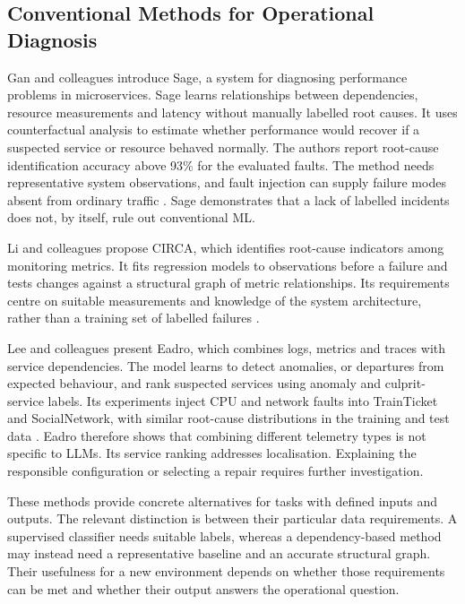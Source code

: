 \subsection{Conventional Methods for Operational Diagnosis}

Gan and colleagues introduce Sage, a system for diagnosing performance problems in
microservices. Sage learns relationships between dependencies, resource
measurements and latency without manually labelled root causes. It uses
counterfactual analysis to estimate whether performance would recover if
a suspected service or resource behaved normally. The authors report
root-cause identification accuracy above 93\% for the evaluated faults.
The method needs representative system observations, and fault injection
can supply failure modes absent from ordinary traffic
\parencite[Sections~3--4, 6--7]{gan2021sage}. Sage demonstrates that a lack
of labelled incidents does not, by itself, rule out conventional ML.

Li and colleagues propose CIRCA, which identifies root-cause indicators among
monitoring metrics. It fits regression models to observations before a
failure and tests changes against a structural graph of metric
relationships. Its requirements centre on suitable measurements and
knowledge of the system architecture, rather than a training set of
labelled failures \parencite[Section~4]{li2022circa}.

Lee and colleagues present Eadro, which combines logs, metrics and traces with
service dependencies. The model learns to detect anomalies, or departures
from expected behaviour, and rank
suspected services using anomaly and culprit-service labels. Its
experiments inject CPU and network faults into TrainTicket and
SocialNetwork, with similar root-cause distributions in the training and
test data \parencite[Sections~IV--V]{lee2023eadro}. Eadro therefore shows
that combining different telemetry types is not specific to LLMs. Its
service ranking addresses localisation. Explaining the responsible
configuration or selecting a repair requires further investigation.

These methods provide concrete alternatives for tasks with defined inputs
and outputs. The relevant distinction is between their particular data
requirements. A supervised classifier needs suitable labels, whereas a
dependency-based method may instead need a representative baseline and
an accurate structural graph. Their usefulness for a new environment
depends on whether those requirements can be met and whether their output
answers the operational question.

